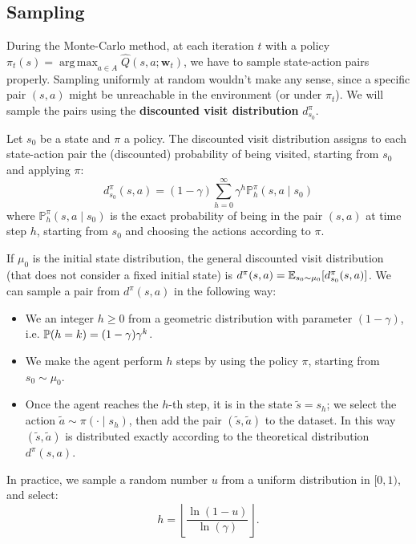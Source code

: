 \documentclass[10pt, a4paper]{report}
\begin{document}
\subsection{Sampling}\label{MC_sampling}
During the Monte-Carlo method, at each iteration $t$ with a policy $\pi_t(s) = \operatorname*{arg\,max}_{a \in A} \hat{Q}(s,a; \mathbf{w}_t)$, we have to sample state-action pairs properly. Sampling uniformly at random wouldn't make any sense, since a specific pair $(s,a)$ might be unreachable in the environment (or under $\pi_t$).
We will sample the pairs using the \textbf{discounted visit distribution} $d_{s_0}^\pi$.
\begin{boxdefinition}{}{}
    Let $s_0$ be a state and $\pi$ a policy. The discounted visit distribution assigns to each state-action pair the (discounted) probability of being visited, starting from $s_0$ and applying $\pi$:
    \begin{equation}
        d^\pi_{s_0}(s, a) = (1 - \gamma) \sum_{h=0}^\infty \gamma^h \mathbb{P}^\pi_h(s, a\mid s_0)
    \end{equation}
    where $\mathbb{P}^\pi_h(s, a\mid s_0)$ is the exact probability of being in the pair $( s, a )$ at time step $h$, starting from
    $s_0 $ and choosing the actions according to $\pi$.
\end{boxdefinition}
If $\mu_0$ is the initial state distribution, the general discounted visit distribution (that does not consider a fixed initial state) is
$d^\pi(s, a) = {\mathbb E}_{s_0\sim\mu_0}[d^\pi_{s_0}(s, a) ]$.
We can sample a pair from $d^\pi(s, a)$ in the following way:
\begin{itemize}
    \item We  an integer $h\ge0$ from a geometric distribution with parameter $(1-\gamma)$, i.e. ${\mathbb P}(h=k)=(1-\gamma)\gamma^k$.
    \item We make the agent perform $h$ steps by using the policy $\pi$, starting from $s_0\sim \mu_0$.
    \item Once the agent reaches the $h$-th step, it is in the state $\tilde{s} = s_h$; we select the action $\tilde{a} \sim \pi(\cdot \mid s_h)$, then add the pair $(\tilde s,\tilde a)$ to the dataset. In this way $(\tilde s,\tilde a)$ is distributed exactly according to the theoretical distribution $d^\pi(s, a)$.
\end{itemize}
\noindent{} In practice, we sample a random number $u$ from a uniform distribution in $[0,1)$, and select:
\begin{equation}
    h = \left\lfloor \frac{\ln(1 - u)}{\ln(\gamma)} \right\rfloor.
\end{equation}
\end{document}
